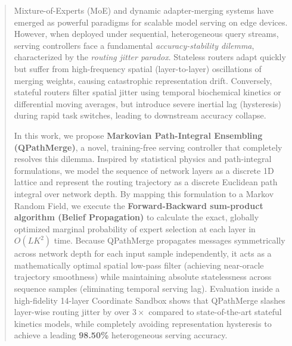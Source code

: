 \begin{abstract}
Mixture-of-Experts (MoE) and dynamic adapter-merging systems have emerged as powerful paradigms for scalable model serving on edge devices. However, when deployed under sequential, heterogeneous query streams, serving controllers face a fundamental \emph{accuracy-stability dilemma}, characterized by the \emph{routing jitter paradox}. Stateless routers adapt quickly but suffer from high-frequency spatial (layer-to-layer) oscillations of merging weights, causing catastrophic representation drift. Conversely, stateful routers filter spatial jitter using temporal biochemical kinetics or differential moving averages, but introduce severe inertial lag (hysteresis) during rapid task switches, leading to downstream accuracy collapse. 

In this work, we propose \textbf{Markovian Path-Integral Ensembling (QPathMerge)}, a novel, training-free serving controller that completely resolves this dilemma. Inspired by statistical physics and path-integral formulations, we model the sequence of network layers as a discrete 1D lattice and represent the routing trajectory as a discrete Euclidean path integral over network depth. By mapping this formulation to a Markov Random Field, we execute the \textbf{Forward-Backward sum-product algorithm (Belief Propagation)} to calculate the exact, globally optimized marginal probability of expert selection at each layer in $O(L K^2)$ time. Because QPathMerge propagates messages symmetrically across network depth for each input sample independently, it acts as a mathematically optimal spatial low-pass filter (achieving near-oracle trajectory smoothness) while maintaining absolute statelessness across sequence samples (eliminating temporal serving lag). Evaluation inside a high-fidelity 14-layer Coordinate Sandbox shows that QPathMerge slashes layer-wise routing jitter by over $3\times$ compared to state-of-the-art stateful kinetics models, while completely avoiding representation hysteresis to achieve a leading \textbf{98.50\%} heterogeneous serving accuracy.
\end{abstract}
